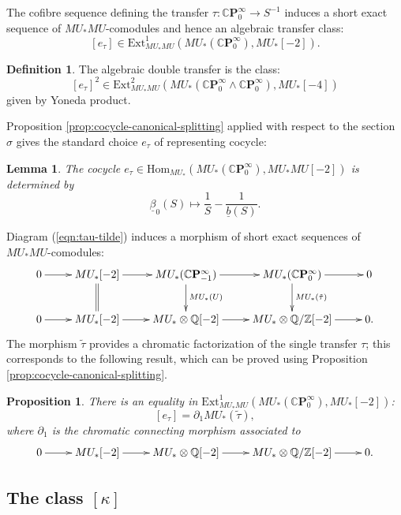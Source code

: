 \documentclass[10pt,a4paper]{amsart}
\newtheorem{prop}[thm]{Proposition}
\newtheorem{lem}[thm]{Lemma}
\theoremstyle{definition}
\newtheorem{defn}[thm]{Definition}
\theoremstyle{remark}
\newcommand{\qz}{{\rat/\zed}}
\renewcommand{\hom}{\mathrm{Hom}}
\newcommand{\ext}{\mathrm{Ext}}
\newcommand{\zed}{\mathbb{Z}}
\newcommand{\rat}{\mathbb{Q}}
\newcommand{\cp}{\mathbb{C} \mathbf{P}^\infty}
\renewcommand{\smash}{\wedge}
\begin{document}
The cofibre sequence defining the transfer $\tau : \cp_0 \rightarrow
S^{-1}$ induces a short exact sequence of $MU_*MU$-comodules and hence an
algebraic transfer class:
\[
[e_\tau] \in \ext^1_{MU_* MU}(MU_* (\cp_0),MU_* [-2]).
\]

\begin{defn}
\label{def:algebraic_double_transfer}
The algebraic double transfer is the class:
\[
 [e_\tau]^2\in \ext^2_{MU_* MU}(MU_* (\cp_0\smash \cp_0 ),MU_* [-4])
\]
given by Yoneda product.
\end{defn}


Proposition \ref{prop:cocycle-canonical-splitting} applied with respect
to the section $\sigma$ gives the standard choice $e_\tau$ of representing cocycle:


\begin{lem}
\label{lem:cocycle-etau}
The cocycle $
{e_\tau} \in \hom_{MU_*}(MU_* (\cp_0), MU_* MU[-2])
$
is determined by
\[
	\underline{\beta}_{0} (S)
\mapsto
\frac{1}{S}
-
\frac{1}{\underline{b} (S)} .
\]
\end{lem}


Diagram (\ref{eqn:tau-tilde}) induces a morphism of short exact sequences of $MU_*MU$-comodules:
\[
	\xymatrix{
0
\ar[r]
&
MU_* [-2]
\ar@{=}[d]
\ar[r]
&
MU_* (\cp_{-1} )
\ar[d]^{MU_* (U)}
\ar[r]
&
MU_* (\cp_0)
\ar[d]^{MU_*(\tilde{\tau})}
\ar[r]
&
0
\\
0
\ar[r]
&
MU_* [-2]
\ar[r]
&
MU_* \otimes \rat [-2]
\ar[r]
&
MU_* \otimes \qz [-2]
\ar[r]
&
0.
}
\]
The morphism $\tilde{\tau}$ provides a chromatic factorization of the single transfer $\tau$; this corresponds to the
following result, which can be proved using Proposition \ref{prop:cocycle-canonical-splitting}.

\begin{prop}
	There is an equality in $\ext^1_{MU_* MU} (MU_* (\cp_0), MU_* [-2])$:
\[
	[e_\tau] = \partial_1 MU_* (\tilde{\tau}),
\]
where $\partial _1$ is the  chromatic connecting morphism
associated to
\[
\xymatrix{
0
\ar[r]
&
MU_* [-2]
\ar[r]
&
MU_* \otimes \rat [-2]
\ar[r]
&
MU_* \otimes \qz [-2]
\ar[r]
&
0.
}
\]
\end{prop}






\subsection{The class $[\kappa]$}
\end{document}
